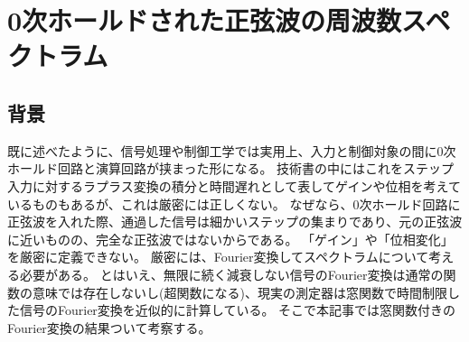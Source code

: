 \chapter{0次ホールドされた正弦波の周波数スペクトラム}
    \label{0次ホールドされた正弦波の周波数スペクトラム}
    \section{背景}
        既に述べたように、信号処理や制御工学では実用上、入力と制御対象の間に0次ホールド回路と演算回路が挟まった形になる。
        技術書の中にはこれをステップ入力に対するラプラス変換の積分と時間遅れとして表してゲインや位相を考えているものもあるが、これは厳密には正しくない。
        なぜなら、0次ホールド回路に正弦波を入れた際、通過した信号は細かいステップの集まりであり、元の正弦波に近いものの、完全な正弦波ではないからである。
        「ゲイン」や「位相変化」を厳密に定義できない。
        厳密には、Fourier変換してスペクトラムについて考える必要がある。
        とはいえ、無限に続く減衰しない信号のFourier変換は通常の関数の意味では存在しないし(超関数になる)、現実の測定器は窓関数で時間制限した信号のFourier変換を近似的に計算している。
        そこで本記事では窓関数付きのFourier変換の結果ついて考察する。

